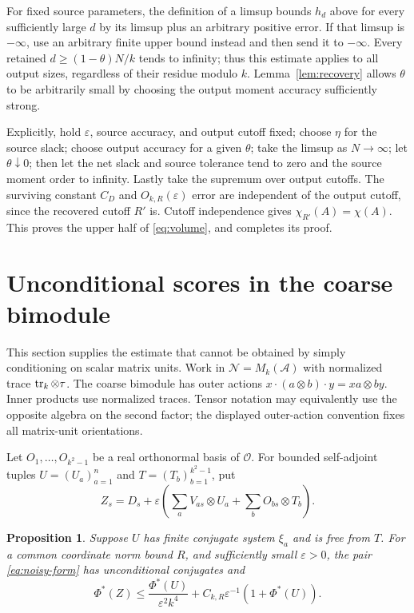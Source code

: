 \documentclass[11pt]{article}
\newtheorem{proposition}[theorem]{Proposition}
\theoremstyle{definition}\newtheorem{definition}[theorem]{Definition}
\theoremstyle{remark}\newtheorem{remark}[theorem]{Remark}
\newcommand{\eps}{\varepsilon}\newcommand{\id}{\mathrm{id}}
\begin{document}
For fixed source parameters, the definition of a limsup bounds $h_d$
above for every sufficiently large $d$ by its limsup plus an arbitrary
positive error. If that limsup is $-\infty$, use an arbitrary finite
upper bound instead and then send it to $-\infty$. Every retained
$d\geq(1-\theta)N/k$ tends to infinity; thus this estimate applies to
all output sizes, regardless of their residue modulo $k$.
Lemma~\ref{lem:recovery} allows $\theta$ to be arbitrarily small by
choosing the output moment accuracy sufficiently strong.

Explicitly, hold $\eps$, source accuracy, and output cutoff fixed;
choose $\eta$ for the source slack; choose output accuracy for a given
$\theta$; take the limsup as $N\to\infty$; let $\theta\downarrow0$;
then let the net slack and source tolerance tend to zero and the source
moment order to infinity. Lastly take the supremum over output
cutoffs. The surviving constant $C_D$ and $O_{k,R}(\eps)$ error are
independent of the output cutoff, since the recovered cutoff $R'$ is.
Cutoff independence gives $\chi_{R'}(A)=\chi(A)$. This proves the
upper half of \eqref{eq:volume}, and completes its proof.

\section{Unconditional scores in the coarse bimodule}
\label{sec:fisher}
This section supplies the estimate that cannot be obtained by simply
conditioning on scalar matrix units. Work in
$\mathcal N=M_k(\mathcal A)$ with normalized trace $\operatorname{tr}_k\otimes\tau$.
The coarse bimodule has outer actions
$x\cdot(a\otimes b)\cdot y=xa\otimes by$. Inner products use normalized
traces. Tensor notation may equivalently use the opposite algebra on
the second factor; the displayed outer-action convention fixes all
matrix-unit orientations.

Let $O_1,\ldots,O_{k^2-1}$ be a real orthonormal basis of $\mathcal O$.
For bounded self-adjoint tuples $U=(U_a)_{a=1}^n$ and
$T=(T_b)_{b=1}^{k^2-1}$, put
\begin{equation}\label{eq:noisy-form}
 Z_s=D_s+\eps\left(\sum_aV_{as}\otimes U_a+
                         \sum_bO_{bs}\otimes T_b\right).
\end{equation}

\begin{proposition}\label{prop:fisher}
Suppose $U$ has finite conjugate system $\xi_a$ and is free from $T$.
For a common coordinate norm bound $R$, and sufficiently small
$\eps>0$, the pair \eqref{eq:noisy-form} has unconditional conjugates
and
\begin{equation}\label{eq:fisher}
 \Phi^*(Z)\leq\frac{\Phi^*(U)}{\eps^2k^4}
       +C_{k,R}\eps^{-1}(1+\Phi^*(U)).
\end{equation}
\end{proposition}
\end{document}
